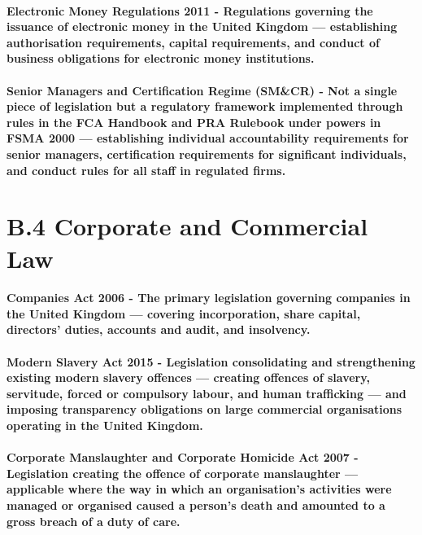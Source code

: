 \paragraph{\textbf{Electronic Money Regulations 2011} - Regulations governing the issuance of electronic money in the United Kingdom — establishing authorisation requirements, capital requirements, and conduct of business obligations for electronic money institutions.}
\paragraph{\textbf{Senior Managers and Certification Regime (SM\&CR)} - Not a single piece of legislation but a regulatory framework implemented through rules in the FCA Handbook and PRA Rulebook under powers in FSMA 2000 — establishing individual accountability requirements for senior managers, certification requirements for significant individuals, and conduct rules for all staff in regulated firms.}

\section*{B.4 Corporate and Commercial Law}
\paragraph{\textbf{Companies Act 2006} - The primary legislation governing companies in the United Kingdom — covering incorporation, share capital, directors' duties, accounts and audit, and insolvency.}
\paragraph{\textbf{Modern Slavery Act 2015} - Legislation consolidating and strengthening existing modern slavery offences — creating offences of slavery, servitude, forced or compulsory labour, and human trafficking — and imposing transparency obligations on large commercial organisations operating in the United Kingdom.}
\paragraph{\textbf{Corporate Manslaughter and Corporate Homicide Act 2007} - Legislation creating the offence of corporate manslaughter — applicable where the way in which an organisation's activities were managed or organised caused a person's death and amounted to a gross breach of a duty of care.}
